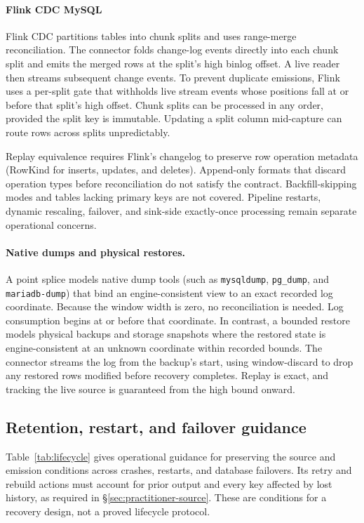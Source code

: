 \documentclass[sigconf,nonacm,10pt]{acmart}
\theoremstyle{plain}
\theoremstyle{definition}
\begin{document}
\paragraph{Flink CDC MySQL}
Flink CDC partitions tables into chunk splits and uses range-merge reconciliation. 
The connector folds change-log events directly into each chunk split and emits 
the merged rows at the split's high binlog offset. A live reader then streams 
subsequent change events. To prevent duplicate emissions, Flink uses a per-split 
gate that withholds live stream events whose positions fall at or before that split's 
high offset. Chunk splits can be processed in any order, provided the split key is immutable. 
Updating a split column mid-capture can route rows across splits unpredictably.

Replay equivalence requires Flink's changelog to preserve row operation metadata 
(RowKind for inserts, updates, and deletes). Append-only formats that discard operation 
types before reconciliation do not satisfy the contract. Backfill-skipping modes and tables 
lacking primary keys are not covered. Pipeline restarts, dynamic rescaling, failover, and 
sink-side exactly-once processing remain separate operational concerns.

\paragraph{Native dumps and physical restores.}
A point splice models native dump tools (such as \texttt{mysqldump}, \texttt{pg\_dump}, 
and \texttt{mariadb-dump}) that bind an engine-consistent view to an exact recorded log 
coordinate. Because the window width is zero, no reconciliation is needed. Log consumption 
begins at or before that coordinate. In contrast, a bounded restore models physical backups 
and storage snapshots where the restored state is engine-consistent at an unknown coordinate 
within recorded bounds. The connector streams the log from the backup's start, using 
window-discard to drop any restored rows modified before recovery completes. Replay is exact, 
and tracking the live source is guaranteed from the high bound onward.



\subsection{Retention, restart, and failover guidance}
\label{sec:practitioner-lifecycle}

Table~\ref{tab:lifecycle} gives operational guidance for preserving the
source and emission conditions across crashes, restarts, and database failovers.
Its retry and rebuild actions must account for prior output and every key
affected by lost history, as required in \S\ref{sec:practitioner-source}.
These are conditions for a recovery design, not a proved lifecycle protocol.
\end{document}
